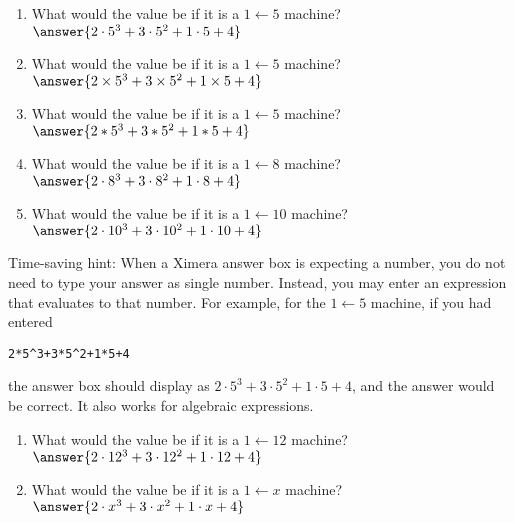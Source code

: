 \documentclass[nooutcomes]{ximera}
\begin{document}
\begin{problem}
\begin{enumerate}
\item What would the value be if it is a $1\leftarrow 5$ machine?  $\answer{2\cdot 5^3+3\cdot 5^2+1\cdot 5+4}$
\item What would the value be if it is a $1\leftarrow 5$ machine?  $\answer{2\times 5^3+3\times 5^2+1\times 5+4}$
\item What would the value be if it is a $1\leftarrow 5$ machine?  $\answer{2*5^3+3*5^2+1*5+4}$
\item What would the value be if it is a $1\leftarrow 8$ machine? $\answer{2\cdot 8^3+3\cdot 8^2+1\cdot 8+4}$
\item What would the value be if it is a $1\leftarrow 10$ machine? $\answer{2\cdot 10^3+3\cdot 10^2+1\cdot 10+4}$
\end{enumerate}


\begin{problem}
Time-saving hint:  When a Ximera answer box is expecting a number, you do not need to type your answer as single number.  Instead, you may enter an expression that evaluates to that number.  
For example, for the $1\leftarrow 5$ machine, if you had entered 
\begin{verbatim}
2*5^3+3*5^2+1*5+4
\end{verbatim}
the answer box should display as $2\cdot 5^3+3\cdot 5^2+1\cdot 5+4$, and the answer would be correct.  It also works for algebraic expressions.  
\begin{enumerate}
\item What would the value be if it is a $1\leftarrow 12$ machine? $\answer{2\cdot 12^3+3\cdot 12^2+1\cdot 12+4}$
\item What would the value be if it is a $1\leftarrow x$ machine? $\answer{2\cdot x^3+3\cdot x^2+1\cdot x+4}$
\end{enumerate}
\end{problem}

\end{problem}
\end{document}
